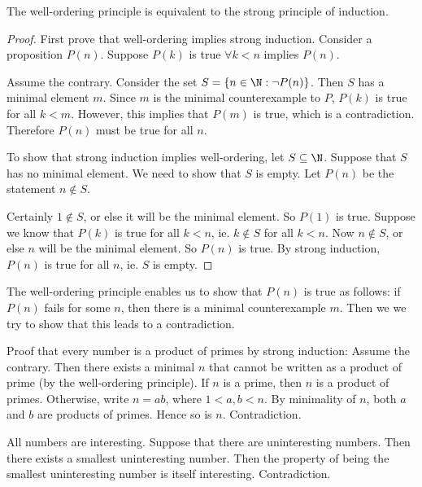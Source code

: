 \documentclass[a4paper]{article}
\begin{document}
  \begin{thm}
    The well-ordering principle is equivalent to the strong principle of induction.
  \end{thm}

  \begin{proof}
    First prove that well-ordering implies strong induction. Consider a proposition $P(n)$. Suppose $P(k)$ is true $\forall k < n$ implies $P(n)$.

    Assume the contrary. Consider the set $S = \{n\in \N : \neg P(n)\}$. Then $S$ has a minimal element $m$. Since $m$ is the minimal counterexample to $P$, $P(k)$ is true for all $k < m$. However, this implies that $P(m)$ is true, which is a contradiction. Therefore $P(n)$ must be true for all $n$.

    To show that strong induction implies well-ordering, let $S\subseteq \N$. Suppose that $S$ has no minimal element. We need to show that $S$ is empty. Let $P(n)$ be the statement $n\not\in S$. 

    Certainly $1\not\in S$, or else it will be the minimal element. So $P(1)$ is true. Suppose we know that $P(k)$ is true for all $k < n$, ie. $k\not\in S$ for all $k < n$. Now $n\not\in S$, or else $n$ will be the minimal element. So $P(n)$ is true. By strong induction, $P(n)$ is true for all $n$, ie. $S$ is empty.
  \end{proof}
  \note The well-ordering principle enables us to show that $P(n)$ is true as follows: if $P(n)$ fails for some $n$, then there is a minimal counterexample $m$. Then we we try to show that this leads to a contradiction.

  \begin{eg}
    Proof that every number is a product of primes by strong induction: Assume the contrary. Then there exists a minimal $n$ that cannot be written as a product of prime (by the well-ordering principle). If $n$ is a prime, then $n$ is a product of primes. Otherwise, write $n = ab$, where $1 < a, b < n$. By minimality of $n$, both $a$ and $b$ are products of primes. Hence so is $n$. Contradiction.
  \end{eg}

  \begin{eg}
    All numbers are interesting. Suppose that there are uninteresting numbers. Then there exists a smallest uninteresting number. Then the property of being the smallest uninteresting number is itself interesting. Contradiction.
  \end{eg}
\end{document}
